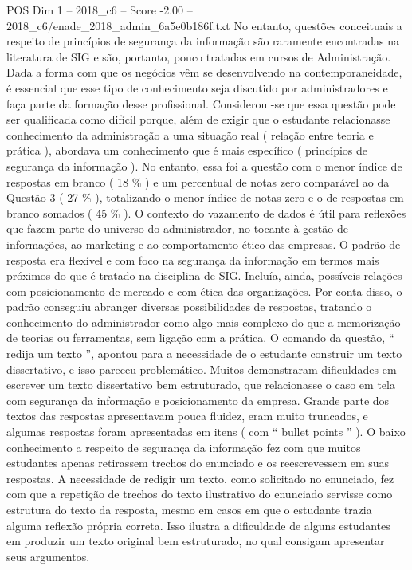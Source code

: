 \begin{textsample}{POS Dim 1 – 2018\_c6 – Score -2.00 – 2018\_c6/enade\_2018\_admin\_6a5e0b186f.txt}
No entanto, questões conceituais a respeito de princípios de segurança da informação são raramente encontradas na literatura de SIG e são, portanto, pouco tratadas em cursos de Administração.
Dada a forma com que os negócios vêm se desenvolvendo na contemporaneidade, é essencial que esse tipo de conhecimento seja discutido por administradores e faça parte da formação desse profissional.
Considerou -se que essa questão pode ser qualificada como difícil porque, além de exigir que o estudante relacionasse conhecimento da administração a uma situação real ( relação entre teoria e prática ), abordava um conhecimento que é mais específico ( princípios de segurança da informação ).
No entanto, essa foi a questão com o menor índice de respostas em branco ( 18 \% ) e um percentual de notas zero comparável ao da Questão 3 ( 27 \% ), totalizando o menor índice de notas zero e o de respostas em branco somados ( 45 \% ).
O contexto do vazamento de dados é útil para reflexões que fazem parte do universo do administrador, no tocante à gestão de informações, ao marketing e ao comportamento ético das empresas.
O padrão de resposta era flexível e com foco na segurança da informação em termos mais próximos do que é tratado na disciplina de SIG.
Incluía, ainda, possíveis relações com posicionamento de mercado e com ética das organizações.
Por conta disso, o padrão conseguiu abranger diversas possibilidades de respostas, tratando o conhecimento do administrador como algo mais complexo do que a memorização de teorias ou ferramentas, sem ligação com a prática.
O comando da questão, “ redija um texto ”, apontou para a necessidade de o estudante construir um texto dissertativo, e isso pareceu problemático.
Muitos demonstraram dificuldades em escrever um texto dissertativo bem estruturado, que relacionasse o caso em tela com segurança da informação e posicionamento da empresa.
Grande parte dos textos das respostas apresentavam pouca fluidez, eram muito truncados, e algumas respostas foram apresentadas em itens ( com “ bullet points ” ).
O baixo conhecimento a respeito de segurança da informação fez com que muitos estudantes apenas retirassem trechos do enunciado e os reescrevessem em suas respostas.
A necessidade de redigir um texto, como solicitado no enunciado, fez com que a repetição de trechos do texto ilustrativo do enunciado servisse como estrutura do texto da resposta, mesmo em casos em que o estudante trazia alguma reflexão própria correta.
Isso ilustra a dificuldade de alguns estudantes em produzir um texto original bem estruturado, no qual consigam apresentar seus argumentos.

\end{textsample}
